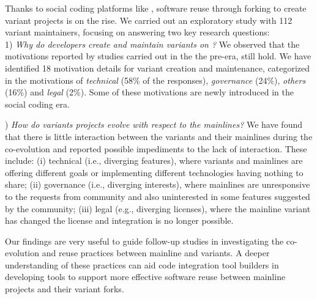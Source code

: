 Thanks to social coding platforms like \gh, software reuse through forking to create variant projects is on the rise.
We carried out an exploratory study with 112 variant maintainers, focusing on answering two key research questions:\\
1) \textit{Why do developers create and maintain variants on \gh?}
We observed that the motivations reported by studies carried out in the the pre-\gh era, still hold. We have identified 18 motivation details  for variant creation and maintenance, categorized in the motivations of \emph{technical} (58\% of the responses), \emph{governance} (24\%), \emph{others} (16\%) and \emph{legal} (2\%). Some of these motivations are newly introduced in the social coding era.

) \textit{How do variants projects evolve with respect to the mainlines?}
We have found that there is little interaction between the variants and their mainlines during the co-evolution and reported possible impediments to the lack of interaction. These include: (i) technical (i.e., diverging features), where variants and mainlines are offering different goals or implementing different technologies having nothing to share; (ii) governance (i.e., diverging interests), where mainlines are unresponsive to the requests from community and also uninterested in some features suggested by the community; (iii) legal (e.g., diverging licenses), where the mainline variant has changed the license and integration is no longer possible.

Our findings are very useful to guide follow-up studies in investigating the co-evolution and reuse practices between mainline and variants. A deeper understanding of these practices can aid code integration tool builders in developing tools to support more effective software reuse between mainline projects and their variant forks.


